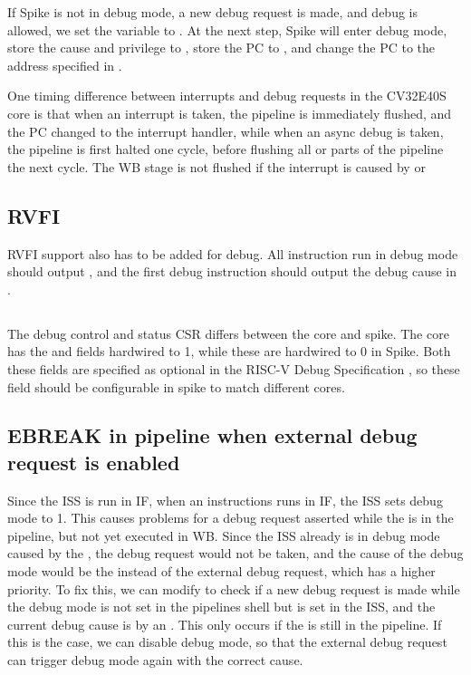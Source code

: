 If Spike is not in debug mode, a new debug request is made, and debug is allowed, we set the  variable to . At the next step, Spike will enter debug mode, store the cause and privilege to , store the PC to , and change the PC to the address specified in . 


One timing difference between interrupts and debug requests in the CV32E40S core is that when an interrupt is taken, the pipeline is immediately flushed, and the PC changed to the interrupt handler, while when an async debug is taken, the pipeline is first halted one cycle, before flushing all or parts of the pipeline the next cycle. The WB stage is not flushed if the interrupt is caused by  or 


\subsection{RVFI}

RVFI support also has to be added for debug. All instruction run in debug mode should output , and the first debug instruction should output the debug cause in  \cite{openhwgroupRISCVFormalInterface2023}.


\subsection{}

The  debug control and status CSR differs between the core and spike. The core has the  and  fields hardwired to 1, while these are hardwired to 0 in Spike. Both these fields are specified as optional in the RISC-V Debug Specification \cite{pauldonahueRISCVDebugSupport2023}, so these field should be configurable in spike to match different cores.


\subsection{EBREAK in pipeline when external debug request is enabled}

Since the ISS is run in IF, when an  instructions runs in IF, the ISS sets debug mode to 1. This causes problems for a debug request asserted while the  is in the pipeline, but not yet executed in WB. Since the ISS already is in debug mode caused by the , the debug request would not be taken, and the cause of the debug mode would be the  instead of the external debug request, which has a higher priority. To fix this, we can modify  to check if a new debug request is made while the debug mode is not set in the pipelines shell but is set in the ISS, and the current debug cause is by an . This only occurs if the  is still in the pipeline. If this is the case, we can disable debug mode, so that the external debug request can trigger debug mode again with the correct cause.


